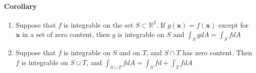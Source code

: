 \documentclass[11pt]{article}
\newcommand{\bx}[0]{\mathbf{x}}
\newcommand{\real}[0]{\mathbb{R}}
\begin{document}
\paragraph{Corollary}
\begin{enumerate}
    \item Suppose that $f$ is integrable on the set $S\subset \real^2$. If $g(\bx) = f(\bx)$ except for $\bx$ in a set of zero content, then $g$ is integrable on $S$ and $\int_S gdA = \int_S fdA$
    \item Suppose that $f$ is integrable on $S$ and on $T$, and $S\cap T$ has zero content. Then $f$ is integrable on $S\cup T$, and $\int_{S\cup T}fdA = \int_Sfd+ \int_TfdA$
\end{enumerate}
 
\end{document}
